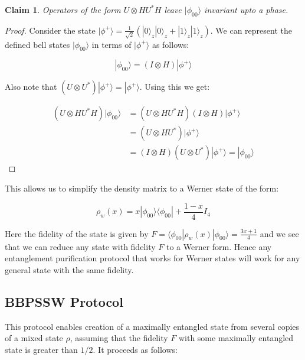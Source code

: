 \documentclass[conference]{IEEEtran}
\newtheorem{claim}{Claim}
\begin{document}
\begin{claim}
    Operators of the form $U \otimes HU^*H$ leave $| \phi_{00} \rangle$ invariant upto a phase.
\end{claim}

\begin{proof}
    Consider the state $| \phi^+ \rangle = \frac{1}{\sqrt{2}} (|0\rangle_z |0\rangle_z + |1\rangle_z |1\rangle_z)$. We can represent the defined bell states $| \phi_{00} \rangle$ in terms of $| \phi^+ \rangle$ as follows:

    \begin{equation}
        | \phi_{00} \rangle = (I \otimes H) | \phi^+ \rangle
    \end{equation}

    Also note  that $(U \otimes U^*) | \phi^+ \rangle = | \phi^+ \rangle$. Using this we get:

    \begin{equation}
        \begin{aligned}
            (U \otimes HU^*H) | \phi_{00} \rangle &= (U \otimes HU^*H)(I \otimes H) | \phi^+ \rangle \\
            &= (U \otimes HU^*) | \phi^+ \rangle \\
            &= (I \otimes H) (U \otimes U^*) | \phi^+ \rangle = | \phi_{00} \rangle
        \end{aligned}
    \end{equation}
\end{proof}

This allows us to simplify the density matrix to a Werner state of the form:

\begin{equation}
    \rho_w(x) = x | \phi_{00} \rangle \langle \phi_{00} | + \frac{1-x}{4} I_4
\end{equation}

Here the fidelity of the state is given by $F = \langle \phi_{00} | \rho_w(x) | \phi_{00} \rangle = \frac{3x + 1}{4}$ and we see that we can reduce any state with fidelity $F$ to a Werner form. Hence any entanglement purification protocol that works for Werner states will work for any general state with the same fidelity.


\subsection{BBPSSW Protocol}
This protocol enables creation of a maximally entangled state from several copies of a mixed state $\rho$, assuming that the fidelity $F$ with some maximally entangled state is greater than $1/2$. It proceeds as follows:
\end{document}
